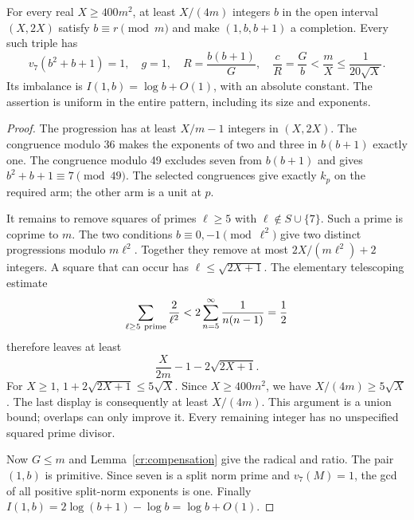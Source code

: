 \begin{theorem}\label{cr:elementary-main}
For every real $X\ge400m^2$, at least $X/(4m)$ integers $b$ in the open
interval $(X,2X)$ satisfy $b\equiv r\pmod m$ and make $(1,b,b+1)$ a
completion. Every such triple has
\begin{equation}\label{cr:elementary-correlation}
 v_7(b^2+b+1)=1,\quad g=1,\quad
 R=\frac{b(b+1)}G,\quad
 \frac cR=\frac Gb<\frac mX\le\frac1{20\sqrt X}.
\end{equation}
Its imbalance is $I(1,b)=\log b+O(1)$, with an absolute constant.
The assertion is uniform in the entire pattern, including its size and exponents.
\end{theorem}
\begin{proof}
The progression has at least $X/m-1$ integers in $(X,2X)$. The congruence
modulo 36 makes the exponents of two and three in $b(b+1)$ exactly one.
The congruence modulo 49 excludes seven from $b(b+1)$ and gives
$b^2+b+1\equiv7\pmod{49}$. The selected congruences give exactly $k_p$
on the required arm; the other arm is a unit at $p$.

It remains to remove squares of primes $\ell\ge5$ with $\ell\notin S\cup\{7\}$.
Such a prime is coprime to $m$. The two conditions
$b\equiv0,-1\pmod{\ell^2}$ give two distinct progressions modulo $m\ell^2$.
Together they remove at most $2X/(m\ell^2)+2$ integers. A square that can
occur has $\ell\le\sqrt{2X+1}$. The elementary telescoping estimate
\[
 \sum_{\ell\ge5\ {\rm prime}}\frac2{\ell^2}
 <2\sum_{n=5}^\infty\frac1{n(n-1)}=\frac12
\]
therefore leaves at least
\[
 \frac X{2m}-1-2\sqrt{2X+1}.
\]
For $X\ge1$, $1+2\sqrt{2X+1}\le5\sqrt X$. Since
$X\ge400m^2$, we have $X/(4m)\ge5\sqrt X$. The last display is consequently
at least $X/(4m)$. This argument is a union bound; overlaps can only improve
it. Every remaining integer has no unspecified squared prime divisor.

Now $G\le m$ and Lemma~\ref{cr:compensation} give the radical and ratio.
The pair $(1,b)$ is primitive. Since seven is a split norm prime and
$v_7(M)=1$, the gcd of all positive split-norm exponents is one. Finally
$I(1,b)=2\log(b+1)-\log b=\log b+O(1)$.
\end{proof}

